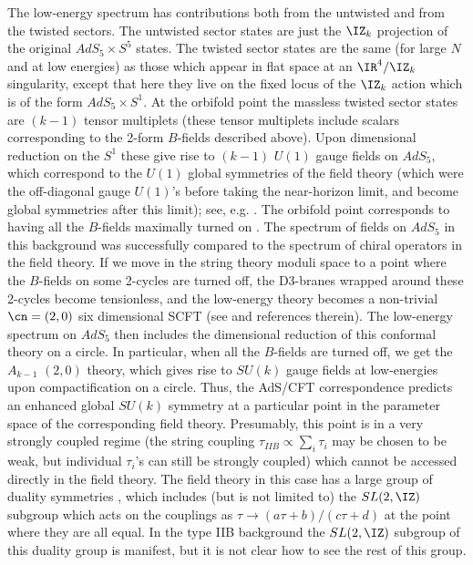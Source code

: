 The low-energy spectrum has contributions both from the untwisted and
from the twisted sectors. The untwisted sector states are just the
$\IZ_k$ projection of the original $AdS_5\times S^5$ states. The
twisted sector states are the same (for large $N$ and at low energies)
as those which appear in flat space at an $\IR^4/\IZ_k$ singularity,
except that here they live on the fixed locus of the $\IZ_k$ action
which is of the form $AdS_5\times S^1$. At the orbifold point the
massless twisted sector states are $(k-1)$ tensor multiplets (these
tensor multiplets include scalars corresponding to the 2-form
$B$-fields described above). Upon dimensional reduction on the $S^1$
these give rise to $(k-1)$ $U(1)$ gauge fields on $AdS_5$, which
correspond to the $U(1)$ global symmetries of the field theory (which
were the off-diagonal gauge $U(1)$'s before taking the near-horizon
limit, and become global symmetries after this limit); see, e.g.
\cite{Hanany:1998it}. The orbifold
point corresponds to having all the $B$-fields maximally turned on
\cite{Aspinwall:1995zi}. 
The spectrum of fields on $AdS_5$ in this background was successfully
compared \cite{Gukov:1998kk} to the spectrum of chiral operators in
the field theory. If we move in the string theory moduli space to a
point where the $B$-fields on some 2-cycles are turned off, the
D3-branes wrapped around these 2-cycles become tensionless, and the
low-energy theory becomes a non-trivial $\cn=(2,0)$ six dimensional
SCFT (see
\cite{Seiberg:1997ax} and references therein). The
low-energy spectrum on $AdS_5$ then includes the dimensional reduction
of this conformal theory on a circle. In particular, when all the
$B$-fields are turned off, we get the $A_{k-1}$ $(2,0)$ theory, which
gives rise to $SU(k)$ gauge fields at low-energies upon
compactification on a circle. Thus, the AdS/CFT correspondence
predicts an enhanced global $SU(k)$ symmetry at a particular point in
the parameter space of the corresponding field theory. Presumably,
this point is in a very strongly coupled regime (the string coupling
$\tau_{IIB} \propto
\sum_i \tau_i$ may be chosen to be weak, but individual $\tau_i$'s can
still be strongly coupled) which cannot be accessed directly in the
field theory. The field theory in this case has a large group of
duality symmetries \cite{Witten:1997so}, which includes (but is not
limited to) the $SL(2,\IZ)$ subgroup which acts on the couplings as
$\tau \to (a \tau + b) / (c \tau + d)$ at the point where they are all
equal. In the type IIB background the $SL(2,\IZ)$ subgroup of this
duality group is manifest, but it is not clear how to see the rest of
this group.

